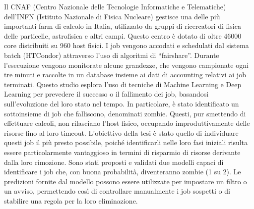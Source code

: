 Il CNAF (Centro Nazionale delle Tecnologie Informatiche e Telematiche)
dell'INFN (Istituto Nazionale di Fisica Nucleare) gestisce una delle più
importanti farm di calcolo in Italia, utilizzato da gruppi di ricercatori di
fisica delle particelle, astrofisica e altri campi.
Questo centro è dotato di oltre 46000 core distribuiti su 960 host fisici. I
job vengono accodati e schedulati dal sistema batch (HTCondor) attraverso
l'uso di algoritmi di ``fairshare''.
Durante l'esecuzione vengono monitorate alcune grandezze, che vengono
campionate ogni tre minuti e raccolte in un database insieme ai dati di
accounting relativi ai job terminati.
Questo studio esplora l'uso di tecniche di Machine Learning e Deep Learning
per prevedere il successo o il fallimento dei job, basandosi sull'evoluzione
del loro stato nel tempo.
In particolare, è stato identificato un sottoinsieme di job che falliscono,
denominati zombie. Questi, pur smettendo di effettuare calcoli, non rilasciano
l'host fisico, occupando improduttivamente delle risorse fino al loro timeout.
L'obiettivo della tesi è stato quello di individuare questi job il più presto
possibile, poiché identificarli nelle loro fasi iniziali risulta essere
particolarmente vantaggioso in termini di risparmio di risorse derivante dalla
loro rimozione.
Sono stati proposti e validati due modelli capaci di identificare i job che,
con buona probabilità, diventeranno zombie (1 su 2). Le predizioni fornite dal
modello possono essere utilizzate per impostare un filtro o un avviso,
permettendo così di controllare manualmente i job sospetti o di stabilire una
regola per la loro eliminazione.
